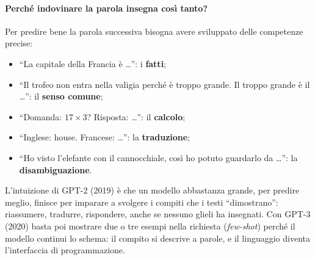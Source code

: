 \paragraph{Perché indovinare la parola insegna così tanto?} Per predire bene la parola successiva bisogna avere sviluppato delle competenze precise:
\begin{itemize}
    \item \enquote{La capitale della Francia è \dots}: i \textbf{fatti};
    \item \enquote{Il trofeo non entra nella valigia perché è troppo grande. Il troppo grande è il \dots}: il \textbf{senso comune};
    \item \enquote{Domanda: $17 \times 3$? Risposta: \dots}: il \textbf{calcolo};
    \item \enquote{Inglese: house. Francese: \dots}: la \textbf{traduzione};
    \item \enquote{Ho visto l'elefante con il cannocchiale, così ho potuto guardarlo da \dots}: la \textbf{disambiguazione}.
\end{itemize}
L'intuizione di GPT-2 (2019) è che un modello abbastanza grande, per predire meglio, finisce per imparare a svolgere i compiti che i testi \enquote{dimostrano}: riassumere, tradurre, rispondere, anche se nessuno glieli ha insegnati. Con GPT-3 (2020) basta poi mostrare due o tre esempi nella richiesta (\textit{few-shot}) perché il modello continui lo schema: il compito si descrive a parole, e il linguaggio diventa l'interfaccia di programmazione.

